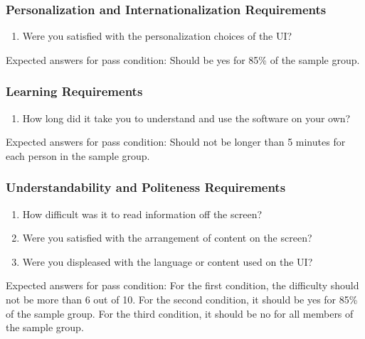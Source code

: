 \documentclass[12pt, titlepage]{article}
\begin{document}
\subsubsection{Personalization and Internationalization Requirements}

\begin{enumerate}
\item{Were you satisfied with the personalization choices of the UI?\\}

\end{enumerate}

\noindent Expected answers for pass condition: Should be yes for 85\% of the sample group. 


\subsubsection{Learning Requirements}

\begin{enumerate}
\item{How long did it take you to understand and use the software on your own?\\}

\end{enumerate}

\noindent Expected answers for pass condition: Should not be longer than 5 minutes for each person in the sample group. 


\subsubsection{Understandability and Politeness Requirements}

\begin{enumerate}
\item{How difficult was it to read information off the screen?\\}
\item{Were you satisfied with the arrangement of content on the screen?\\}
\item{Were you displeased with the language or content used on the UI?\\}

\end{enumerate}

\noindent Expected answers for pass condition: For the first condition, the difficulty should not be more than 6 out of 10. For the second condition, it should be yes for 85\% of the sample group. For the third condition, it should be no for all members of the sample group.
\end{document}
